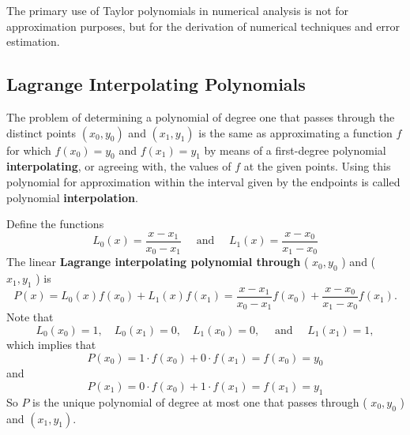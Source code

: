 %
The primary use of Taylor polynomials in numerical analysis is not for approximation purposes, but for the derivation of numerical techniques and error estimation.

\subsection*{Lagrange Interpolating Polynomials}
The problem of determining a polynomial of degree one that passes through the distinct points $\left(x_{0}, y_{0}\right)$ and $\left(x_{1}, y_{1}\right)$ is the same as approximating a function $f$ for which $f\left(x_{0}\right)=y_{0}$ and $f\left(x_{1}\right)=y_{1}$ by means of a first-degree polynomial {\bf interpolating}, or agreeing with, the values of $f$ at the given points. Using this polynomial for approximation within the interval given by the endpoints is called polynomial {\bf interpolation}.

Define the functions
\[L_{0}(x)=\frac{x-x_{1}}{x_{0}-x_{1}} \quad \text { and } \quad L_{1}(x)=\frac{x-x_{0}}{x_{1}-x_{0}}\]
The linear {\bf Lagrange interpolating polynomial through} ( $x_{0}, y_{0}$ ) and ( $x_{1}, y_{1}$ ) is
\[P(x)=L_{0}(x) f\left(x_{0}\right)+L_{1}(x) f\left(x_{1}\right)=\frac{x-x_{1}}{x_{0}-x_{1}} f\left(x_{0}\right)+\frac{x-x_{0}}{x_{1}-x_{0}} f\left(x_{1}\right).\]
Note that
\[L_{0}\left(x_{0}\right)=1, \quad L_{0}\left(x_{1}\right)=0, \quad L_{1}\left(x_{0}\right)=0, \quad \text { and } \quad L_{1}\left(x_{1}\right)=1,\]
which implies that
\[P\left(x_{0}\right)=1 \cdot f\left(x_{0}\right)+0 \cdot f\left(x_{1}\right)=f\left(x_{0}\right)=y_{0}\]
and
\[P\left(x_{1}\right)=0 \cdot f\left(x_{0}\right)+1 \cdot f\left(x_{1}\right)=f\left(x_{1}\right)=y_{1}\]
So $P$ is the unique polynomial of degree at most one that passes through ( $x_{0}, y_{0}$ ) and $\left(x_{1}, y_{1}\right)$.

